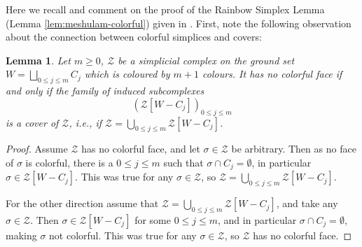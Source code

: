 \documentclass[a4paper,11pt,reqno, english]{amsart}
\newtheorem{lemma}[theorem]{Lemma}
\theoremstyle{definition}
\theoremstyle{remark}
\begin{document}
Here we recall and comment on the proof of the Rainbow Simplex Lemma (Lemma \ref{lem:meshulam-colorful}) given in \cite[Proposition 3.1]{KalaiMeshulam2005}. First, note the following observation about the connection between colorful simplices and covers:
\begin{lemma}\label{lem:colorful-simplices-vs-covers}
    Let $m\geq 0$, $\mathscr{Z}$ be a simplicial complex on the ground set $W=\bigsqcup_{0\leq j\leq m}C_j$ which is coloured by $m+1$ colours. It has no colorful face if and only if the family of induced subcomplexes
    \[
        (\mathscr{Z}[W-C_j])_{0\leq j\leq m}
    \]
    is a cover of $\mathscr{Z}$, i.e., if $\mathscr{Z}=\bigcup_{0\leq j\leq m}\mathscr{Z}[W-C_j]$.
\end{lemma}
\begin{proof}
    Assume $\mathscr{Z}$ has no colorful face, and let $\sigma\in \mathscr{Z}$ be arbitrary. Then as no face of $\sigma$ is colorful, there is a $0\leq j\leq m$ such that $\sigma\cap C_j=\emptyset$, in particular $\sigma\in \mathscr{Z}[W-C_j]$. This was true for any $\sigma\in \mathscr{Z}$, so $\mathscr{Z}=\bigcup_{0\leq j\leq m}\mathscr{Z}[W-C_j]$.

    For the other direction assume that $\mathscr{Z}=\bigcup_{0\leq j\leq m}\mathscr{Z}[W-C_j]$, and take any $\sigma\in \mathscr{Z}$. Then $\sigma\in \mathscr{Z}[W-C_j]$ for some $0\leq j\leq m$, and in particular $\sigma\cap C_j=\emptyset$, making $\sigma$ not colorful. This was true for any $\sigma\in \mathscr{Z}$, so $\mathscr{Z}$ has no colorful face.
\end{proof}
\end{document}
